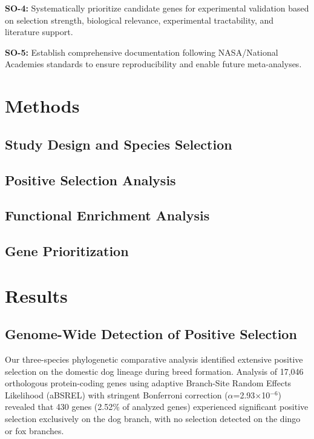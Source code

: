 \documentclass[11pt,letterpaper]{article}
\begin{document}
\textbf{SO-4:} Systematically prioritize candidate genes for experimental validation based on selection strength, biological relevance, experimental tractability, and literature support.

\textbf{SO-5:} Establish comprehensive documentation following NASA/National Academies standards to ensure reproducibility and enable future meta-analyses.


\section{Methods}


\subsection{Study Design and Species Selection}

\subsection{Positive Selection Analysis}

\subsection{Functional Enrichment Analysis}

\subsection{Gene Prioritization}

\section{Results}


\subsection{Genome-Wide Detection of Positive Selection}

Our three-species phylogenetic comparative analysis identified extensive positive selection on the domestic dog lineage during breed formation. Analysis of 17,046 orthologous protein-coding genes using adaptive Branch-Site Random Effects Likelihood (aBSREL) with stringent Bonferroni correction ($\alpha$=2.93$\times$10$^{-6}$) revealed that 430 genes (2.52\% of analyzed genes) experienced significant positive selection exclusively on the dog branch, with no selection detected on the dingo or fox branches.
\end{document}
